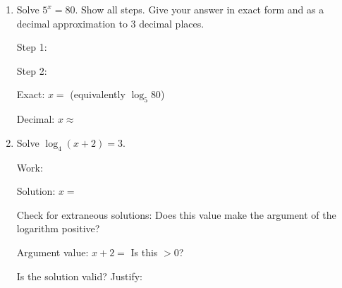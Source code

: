 \documentclass[10pt]{article}
\begin{document}
\namedateperiod

\vspace{0.14in}

\begin{enumerate}[leftmargin=1.8em, itemsep=18pt]

\item Solve $5^x = 80$. Show all steps. Give your answer in exact form and as a decimal
      approximation to 3 decimal places.

\vspace{6pt}
Step 1: 

\vspace{6pt}
Step 2: 

\vspace{6pt}
Exact: $x = $  \quad (equivalently $\log_5 80$)

\vspace{6pt}
Decimal: $x \approx $ 

\vspace{10pt}

\item Solve $\log_4(x + 2) = 3$.

\vspace{6pt}
Work:

\vspace{6pt}

\vspace{8pt}
Solution: $x = $ 

\vspace{8pt}
Check for extraneous solutions: Does this value make the argument of the logarithm positive?

\vspace{6pt}
Argument value: $x + 2 = $  \qquad Is this $> 0$? 

\vspace{6pt}
Is the solution valid?  \quad Justify: 

\end{enumerate}
\end{document}
